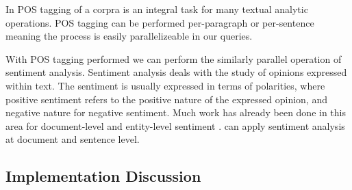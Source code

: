In POS tagging of a corpra is an integral task for many 
textual analytic operations. POS tagging can be performed per-paragraph or 
per-sentence meaning the process is easily parallelizeable in our queries.

With POS tagging performed we can perform the similarly parallel operation 
of sentiment analysis.
Sentiment analysis deals with the study of opinions expressed within text. 
The sentiment is usually expressed in terms of polarities, where positive
sentiment refers to the positive nature of the expressed opinion, and negative
nature for negative sentiment. Much work has already been done in this
area for document-level and entity-level sentiment \cite{o2010tweets,
zhang2011combining}. 
{\system} can apply sentiment analysis at document and sentence level.


\subsection{Implementation Discussion}
\label{sec:impdis}

